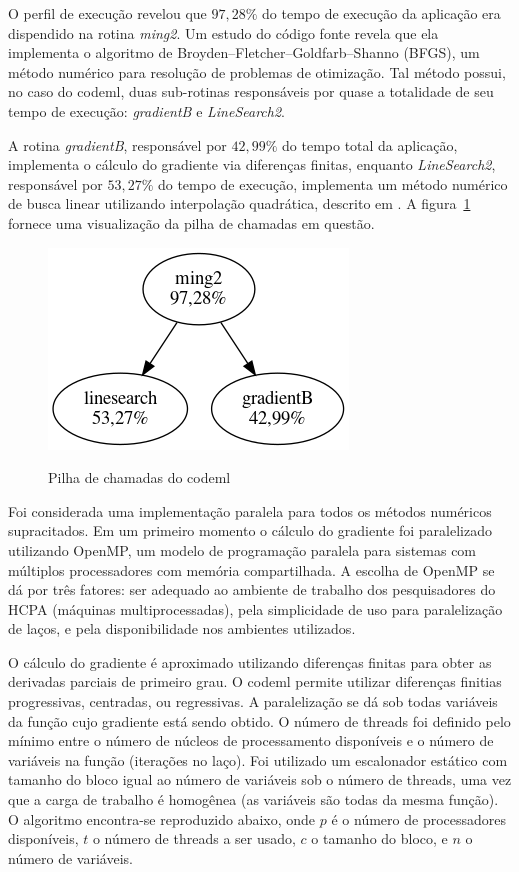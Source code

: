 \documentclass[cic,tc]{iiufrgs}
\begin{document}
O perfil de execução revelou que $97,28\%$ do tempo de execução da aplicação
era dispendido na rotina \textit{ming2}. Um estudo do código fonte revela que
ela implementa o algoritmo de Broyden–Fletcher–Goldfarb–Shanno (BFGS), um
método numérico para resolução de problemas de otimização. Tal método possui,
no caso do codeml, duas sub-rotinas responsáveis por quase a totalidade de seu
tempo de execução: \textit{gradientB} e \textit{LineSearch2}.

A rotina \textit{gradientB}, responsável por $42,99\%$ do tempo total da
aplicação, implementa o cálculo do gradiente via diferenças finitas, enquanto
\textit{LineSearch2}, responsável por $53,27\%$ do tempo de execução,
implementa um método numérico de busca linear utilizando interpolação
quadrática, descrito em \cite{wolfe1978numerical}. A
figura~\ref{fig:kcachegrind} fornece uma visualização da pilha de chamadas em
questão.

\begin{figure} \caption{Pilha de chamadas do codeml} \begin{center}
\includegraphics[width=0.3\linewidth]{img/kcachegrind.png} \end{center}
 \label{fig:kcachegrind} \end{figure}

Foi considerada uma implementação paralela para todos os métodos numéricos
supracitados. Em um primeiro momento o cálculo do gradiente foi paralelizado
utilizando OpenMP, um modelo de programação paralela para sistemas com
múltiplos processadores com memória compartilhada.\cite{chandra2001parallel} A
escolha de OpenMP se dá por três fatores: ser adequado ao ambiente de trabalho
dos pesquisadores do HCPA (máquinas multiprocessadas), pela simplicidade de uso
para paralelização de laços, e pela disponibilidade nos ambientes utilizados.

O cálculo do gradiente é aproximado utilizando diferenças finitas para obter as
derivadas parciais de primeiro grau. O codeml permite utilizar diferenças
finitias progressivas, centradas, ou regressivas. A paralelização se dá sob
todas variáveis da função cujo gradiente está sendo obtido. O número de threads
foi definido pelo mínimo entre o número de núcleos de processamento disponíveis
e o número de variáveis na função (iterações no laço). Foi utilizado um
escalonador estático com tamanho do bloco igual ao número de variáveis sob o
número de threads, uma vez que a carga de trabalho é homogênea (as variáveis
são todas da mesma função). O algoritmo encontra-se reproduzido abaixo, onde
$p$ é o número de processadores disponíveis, $t$ o número de threads a ser
usado, $c$ o tamanho do bloco, e $n$ o número de variáveis.
\end{document}

